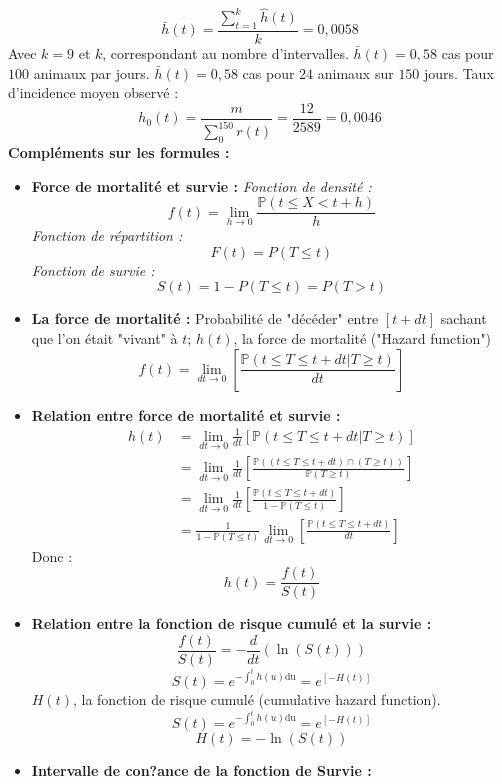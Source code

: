 $$\bar{h}(t) = \frac{\sum_{t=1}^{k} \widehat{h}(t)}{k} = 0,0058$$
Avec $k = 9$ et $k$, correspondant au nombre d'intervalles.\newline
$\bar{h}(t) = 0,58$ cas pour $100$ animaux par jours.\newline
$\bar{h}(t) = 0,58$ cas pour $24$ animaux sur $150$ jours.\newline
Taux d'incidence moyen observé : 
$$ h_{0}(t) = \frac{m}{\sum_{0}^{150}r(t)} = \frac{12}{2589} = 0,0046$$
\textbf{Compléments sur les formules :}
\begin{itemize}
\item \textbf{Force de mortalité et survie : }\newline
\textit{Fonction de densité :}
$$f(t) = \lim\limits_{h \rightarrow 0} \frac{\mathbb{P}(t\leq X < t+h)}{h}$$
\textit{Fonction de répartition :}
$$F(t) = P(T \leq t)$$
\textit{Fonction de survie :}
$$S(t) = 1 - P(T \leq t) = P(T > t)$$
\item \textbf{La force de mortalité :} \newline
Probabilité de "décéder" entre $[t + dt]$ sachant que l'on était "vivant" à $t$; $h(t)$, la force de mortalité ("Hazard function")
$$f(t) = \lim\limits_{dt \rightarrow 0} \left[\frac{\mathbb{P}(t\leq T \leq t+dt | T \geq t)}{dt}\right]$$
\item \textbf{Relation entre force de mortalité et survie :} 
$$
\begin{aligned}
h(t) & = \lim\limits_{dt \rightarrow 0} \frac{1}{dt}\left[\mathbb{P}(t\leq T \leq t+dt | T \geq t)\right]\\
	 & = \lim\limits_{dt \rightarrow 0} \frac{1}{dt}\left[\frac{\mathbb{P}((t\leq T \leq t+dt) \cap (T \geq t))}{\mathbb{P}(T \geq t)}\right]\\
     & = \lim\limits_{dt \rightarrow 0} \frac{1}{dt} \left[\frac{\mathbb{P}(t\leq T \leq t+dt)}{1 - \mathbb{P}(T \leq t)}\right]\\
     & = \frac{1}{1 - \mathbb{P}(T \leq t)} \lim\limits_{dt \rightarrow 0} \left[\frac{\mathbb{P}(t\leq T \leq t+dt)}{dt}\right]
\end{aligned}
$$
Donc : 
$$h(t) = \frac{f(t)}{S(t)}$$
\item \textbf{Relation entre la fonction de risque cumulé et la survie :}
$$\frac{f(t)}{S(t)} = - \frac{d}{dt} \left(\ln(S(t))\right)$$
$$S(t) = e^{-\int_{0}^{t}h(u)\textrm{du}} =e^{[-H(t)]}$$
$H(t)$, la fonction de risque cumulé (cumulative hazard function).
$$S(t) = e^{-\int_{0}^{t}h(u)\textrm{du}} =e^{[-H(t)]}$$
$$H(t) = - \ln(S(t))$$
\item \textbf{Intervalle de con?ance de la fonction de Survie :}\newline

\end{itemize}
